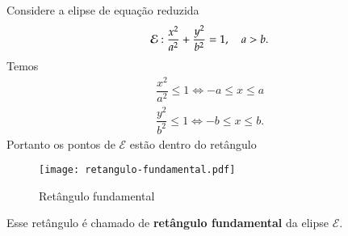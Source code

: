 Considere a elipse de equa\c{c}\~ao reduzida
\[
  \mathcal{E}: \dfrac{x^2}{a^2} + \dfrac{y^2}{b^2} = 1,\quad a > b.
\]
Temos
\begin{align*}
  \dfrac{x^2}{a^2} \le 1 \Leftrightarrow -a \le x \le a\\
  \dfrac{y^2}{b^2} \le 1 \Leftrightarrow -b \le x \le b.
\end{align*}
Portanto os pontos de $\mathcal{E}$ est\~ao dentro do ret\^angulo
\begin{figure}[!h]
  \centering
  \caption{Ret\^angulo fundamental}
  \texttt{[image: retangulo-fundamental.pdf]}
\end{figure}
Esse ret\^angulo \'e chamado de \textbf{ret\^angulo fundamental} da elipse $\mathcal{E}$.


